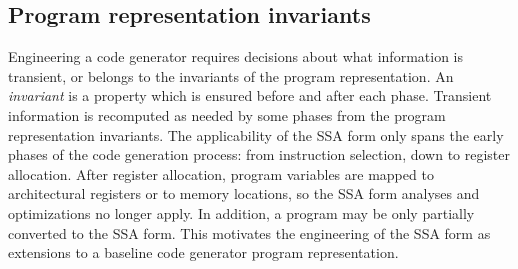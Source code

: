 

%
%
%
%
%
%

%
%

\subsection{Program representation invariants}


Engineering a code generator requires decisions about what information is
transient, or belongs to the invariants of the program representation.  An
\emph{invariant} is a property which is ensured before and after each phase.
Transient information is recomputed as needed by some phases from the program
representation invariants.  The applicability of the SSA form only spans the
early phases of the code generation process: from instruction selection, down to
register allocation.  After register allocation, program variables are mapped to
architectural registers or to memory locations, so the SSA form analyses and
optimizations no longer apply. In addition, a program may be only partially
converted to the SSA form. This motivates the engineering of the SSA form
as extensions to a baseline code generator program representation.


